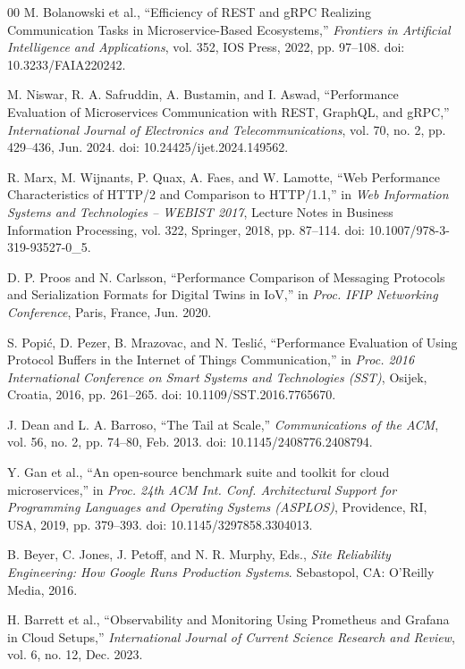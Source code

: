 \documentclass[conference]{IEEEtran}
\begin{document}
\begin{thebibliography}{00}
 M. Bolanowski et al., ``Efficiency of REST and gRPC Realizing Communication Tasks in Microservice-Based Ecosystems,'' \textit{Frontiers in Artificial Intelligence and Applications}, vol. 352, IOS Press, 2022, pp. 97--108. doi: 10.3233/FAIA220242.

 M. Niswar, R. A. Safruddin, A. Bustamin, and I. Aswad, ``Performance Evaluation of Microservices Communication with REST, GraphQL, and gRPC,'' \textit{International Journal of Electronics and Telecommunications}, vol. 70, no. 2, pp. 429--436, Jun. 2024. doi: 10.24425/ijet.2024.149562.

 R. Marx, M. Wijnants, P. Quax, A. Faes, and W. Lamotte, ``Web Performance Characteristics of HTTP/2 and Comparison to HTTP/1.1,'' in \textit{Web Information Systems and Technologies -- WEBIST 2017}, Lecture Notes in Business Information Processing, vol. 322, Springer, 2018, pp. 87--114. doi: 10.1007/978-3-319-93527-0\_5.

 D. P. Proos and N. Carlsson, ``Performance Comparison of Messaging Protocols and Serialization Formats for Digital Twins in IoV,'' in \textit{Proc. IFIP Networking Conference}, Paris, France, Jun. 2020.

 S. Popi\'{c}, D. Pezer, B. Mrazovac, and N. Tesli\'{c}, ``Performance Evaluation of Using Protocol Buffers in the Internet of Things Communication,'' in \textit{Proc. 2016 International Conference on Smart Systems and Technologies (SST)}, Osijek, Croatia, 2016, pp. 261--265. doi: 10.1109/SST.2016.7765670.

 J. Dean and L. A. Barroso, ``The Tail at Scale,'' \textit{Communications of the ACM}, vol. 56, no. 2, pp. 74--80, Feb. 2013. doi: 10.1145/2408776.2408794.

 Y. Gan et al., ``An open-source benchmark suite and toolkit for cloud microservices,'' in \textit{Proc. 24th ACM Int. Conf. Architectural Support for Programming Languages and Operating Systems (ASPLOS)}, Providence, RI, USA, 2019, pp. 379--393. doi: 10.1145/3297858.3304013.

 B. Beyer, C. Jones, J. Petoff, and N. R. Murphy, Eds., \textit{Site Reliability Engineering: How Google Runs Production Systems}. Sebastopol, CA: O'Reilly Media, 2016.

 H. Barrett et al., ``Observability and Monitoring Using Prometheus and Grafana in Cloud Setups,'' \textit{International Journal of Current Science Research and Review}, vol. 6, no. 12, Dec. 2023.

\end{thebibliography}
\end{document}
